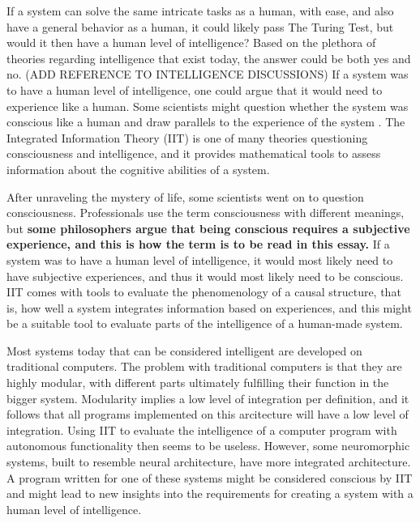 If a system can solve the same intricate tasks as a human, with ease, and also have a general behavior as a human,
it could likely pass The Turing Test, but would it then have a human level of intelligence?
Based on the plethora of theories regarding intelligence that exist today, the answer could be both yes and no. (ADD REFERENCE TO INTELLIGENCE DISCUSSIONS)
If a system was to have a human level of intelligence, one could argue that it would need to experience like a human.
Some scientists might question whether the system was conscious like a human and draw parallels to the experience of the system \cite{tononi_integrated_2016}.
The Integrated Information Theory (IIT) is one of many theories questioning consciousness and intelligence, and it provides mathematical tools
to assess information about the cognitive abilities of a system.

After unraveling the mystery of life, some scientists went on to question consciousness.
Professionals use the term consciousness with different meanings, but \textbf{some philosophers argue that being conscious requires a subjective experience, and this is how the term is to be read in this essay.}
If a system was to have a human level of intelligence, it would most likely need to have subjective experiences, and thus it would most likely need to be conscious.
IIT comes with tools to evaluate the phenomenology of a causal structure, that is,
how well a system integrates information based on experiences, and this might be a suitable tool to evaluate parts of the intelligence of a human-made system.

Most systems today that can be considered intelligent are developed on traditional computers. The problem with traditional computers is that they are highly modular, with different parts ultimately fulfilling their function in the bigger system. Modularity implies a low level of integration per definition, and it follows that all programs implemented on this arcitecture will have a low level of integration.
Using IIT to evaluate the intelligence of a computer program with autonomous functionality then seems to be useless.
However, some neuromorphic systems, built to resemble neural architecture, have more integrated architecture.
A program written for one of these systems might be considered conscious by IIT and might lead to new insights into the requirements for creating a system with a human level of intelligence.
